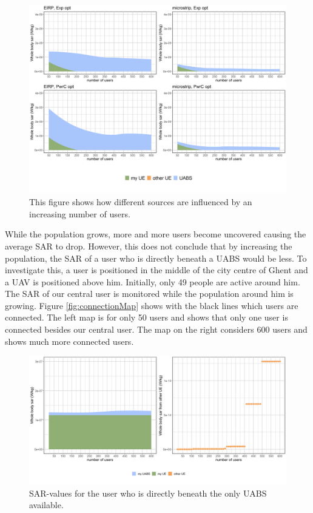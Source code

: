 \begin{figure}[h!]
\centering
  \includegraphics[width=\textwidth/6*5]{../results/s2/uFourSources.png}
  \caption{This figure shows how different sources are influenced by an increasing number of users. }
  \label{fig:s2fourSourcesMatrix}
\end{figure}

While the population grows, more and more users become uncovered causing the average SAR to drop. 
However, this does not conclude that  by increasing the population, the SAR of a user who is directly beneath a \gls{UABS} would be less.
To investigate this, a user is positioned in the middle of the city centre of Ghent and a \gls{UAV} is positioned above him. Initially, only 
49 people are active around him. The \gls{SAR} of our central user is monitored while the population around him is growing.
Figure \ref{fig:connectionMap} shows with the black lines which users are connected. The left map is for only 50 users and 
shows that only one user is connected besides our central user. The map on the right considers 600 users and shows much more connected users.

\begin{figure}[h!]
\centering
  \includegraphics[width=\textwidth/6*5]{../results/s2/uvsulsarcentralUser.png}
  \caption{SAR-values for the user who is directly beneath the only \gls{UABS} available.}
  \label{fig:uvsulsarcentralUsers}
\end{figure}

